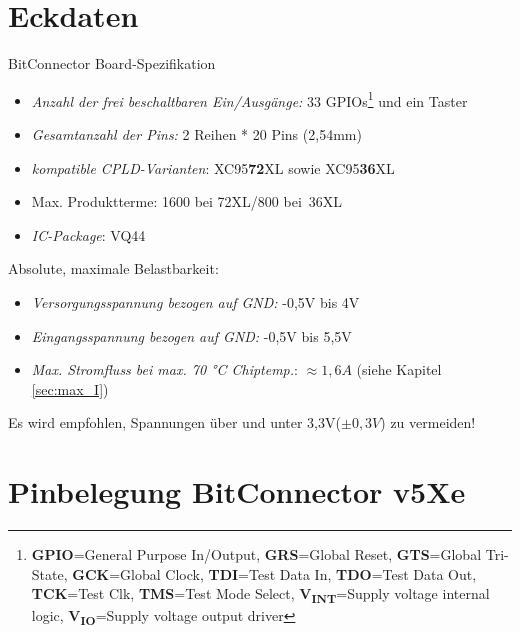 \documentclass{article}
\begin{document}
\section{Eckdaten} 

BitConnector Board-Spezifikation
\begin{itemize}
	\item \textit{Anzahl der frei beschaltbaren Ein/Ausgänge:} \hspace{0.3cm} 33 GPIOs\footnote{\textbf{GPIO}=General Purpose In/Output, \textbf{GRS}=Global Reset, \textbf{GTS}=Global Tri-State, \textbf{GCK}=Global Clock, \textbf{TDI}=Test Data In, \textbf{TDO}=Test Data Out, \textbf{TCK}=Test Clk, \textbf{TMS}=Test Mode Select, \textbf{V\textsubscript{INT}}=Supply voltage internal logic, \textbf{V\textsubscript{IO}}=Supply voltage output driver} und ein Taster
	\item \textit{Gesamtanzahl der Pins:} \hspace{3.6cm} 2 Reihen * 20 Pins (2,54mm)
	\item \textit{kompatible CPLD-Varianten}: \hspace{2.8cm} XC95\textbf{72}XL sowie XC95\textbf{36}XL
	\item Max. Produktterme: \hspace{4.1cm} 1600 bei 72XL/800 bei~36XL
	\item \textit{IC-Package}: \hspace{5.3cm} VQ44 
\end{itemize}

Absolute, maximale Belastbarkeit:
\begin{itemize}
	\item \textit{Versorgungsspannung bezogen auf GND:} \hspace{1cm} -0,5V bis 4V
	\item \textit{Eingangsspannung bezogen auf GND:} \hspace{1.45cm} -0,5V bis 5,5V
	\item \textit{Max. Stromfluss bei max. 70 \si{\celsius} Chiptemp.}:\hspace{0.6cm} $\approx1,6A$ (siehe Kapitel \ref{sec:max_I})
\end{itemize}

Es wird empfohlen, Spannungen über und unter 3,3V($\pm 0,3V$) zu vermeiden!

\section{Pinbelegung BitConnector v5Xe}
\label{sec:Pins}
\end{document}
